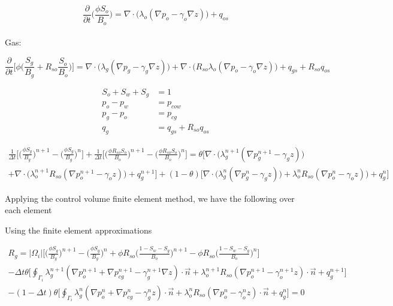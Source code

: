 \documentclass[12pt]{article}
\begin{document}
\begin{equation}
\frac{\partial}{\partial t}\Big(\frac{\phi S_o}{B_o}\Big) = \nabla\cdot\Big(\lambda_o(\nabla p_o-\gamma_o\nabla z)\Big)+q_{os}
\end{equation}
\\
Gas:

\begin{equation}
\frac{\partial}{\partial t}\Big[\phi\Big(\frac{ S_g}{B_g}+R_{so}\frac{ S_o}{B_o}\Big)\Big] =  \nabla\cdot\Big(\lambda_g(\nabla p_g-\gamma_g\nabla z)\Big)+\nabla\cdot\Big(R_{so}\lambda_o(\nabla p_o-\gamma_o\nabla z)\Big)+q_{gs}+R_{so}q_{os}
\end{equation}

\begin{equation}
\begin{split}
S_o+S_w+S_g&=1 \\
p_o-p_w  &= p_{cow}		\\
p_g-p_o  &= p_{cg}		\\
q_g &= q_{gs}+R_{so}q_{os}
\end{split}
\end{equation}

\begin{multline}	\label{g1}
\frac{1}{\Delta t}\Big[\Big(\frac{\phi S_g}{B_g}\Big)^{n+1}-\Big(\frac{\phi S_g}{B_g}\Big)^n\Big] + \frac{1}{\Delta t}\Big[\Big(\frac{\phi R_{so}S_o}{B_o}\Big)^{n+1}-\Big(\frac{\phi R_{so}S_o}{B_o}\Big)^n\Big]  = \theta\Big[ \nabla\cdot\Big(\lambda^{n+1}_g(\nabla p^{n+1}_g-\gamma_gz)\Big)	\\
+\nabla\cdot\Big(\lambda^{n+1}_oR_{so}(\nabla p^{n+1}_o-\gamma_oz)\Big)+q^{n+1}_{g}\Big]	
+(1-\theta)\Big[\nabla\cdot\Big(\lambda^{n}_g(\nabla p^{n}_g-\gamma_gz)\Big)+\lambda^{n}_oR_{so}(\nabla p^{n}_o-\gamma_oz)\Big)+q^{n}_{g}\Big]
\end{multline}

Applying the control volume finite element method, we have the following over each element


Using the  finite element approximations

\begin{multline}	\label{g2a}
R_g = |\Omega_i|\Big[\Big(\frac{\phi S_g}{B_g}\Big)^{n+1}-\Big(\frac{\phi S_g}{B_g}\Big)^n + \phi R_{so}\Big(\frac{1-S_w-S_g}{B_o}\Big)^{n+1}- \phi R_{so}\Big(\frac{1-S_w-S_g}{B_o}\Big)^{n}\Big] \\
- \Delta t\theta\Big[\oint_{\Gamma_i}\lambda^{n+1}_g(\nabla p^{n+1}_o+\nabla p^{n+1}_{cg}-\gamma^{n+1}_g\nabla z)\cdot\vec{n} + \lambda^{n+1}_oR_{so}(\nabla p^{n+1}_o-\gamma^{n+1}_oz)\cdot\vec{n}+ q^{n+1}_{g}\Big]  \\
- (1-\Delta t)\theta\Big[\oint_{\Gamma_i}\lambda^{n}_g(\nabla p^{n}_o+\nabla p^{n}_{cg}-\gamma^{n}_gz)\cdot\vec{n} + \lambda^{n}_oR_{so}(\nabla p^{n}_o-\gamma^{n}_oz)\cdot\vec{n}+ q^{n}_{g}\Big]  =0
\end{multline}
\end{document}
